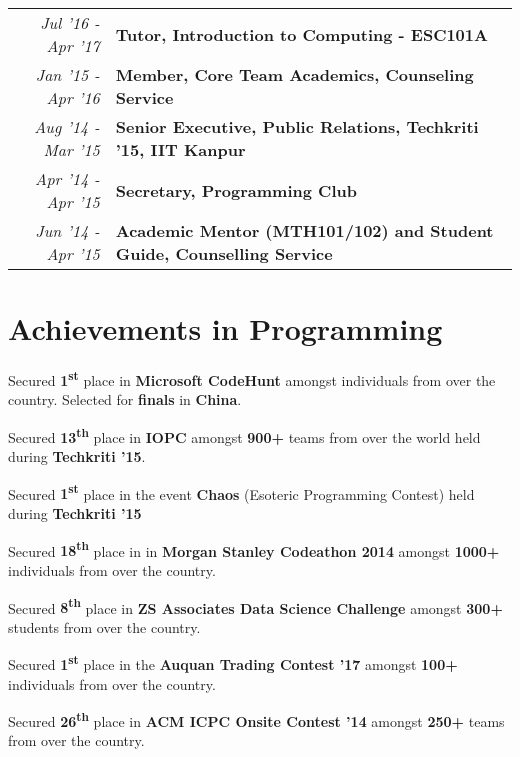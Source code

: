 \documentclass[a4paper]{norm-resume}
\begin{document}
\vspace{1mm} %
		
	\begin{tabular}{r|p{16cm}}	

	\null \hspace{10mm} \emph{Jul '16 - Apr '17} & \textbf{Tutor, Introduction to Computing - ESC101A}\\
	
	\emph{Jan '15 - Apr '16} & \textbf{Member, Core Team Academics, Counseling Service}\\

	\emph{Aug '14 - Mar '15} & \textbf{Senior Executive, Public Relations, Techkriti '15, IIT Kanpur}\\

	\emph{Apr '14 - Apr '15} & \textbf{Secretary, Programming Club}\\

	\emph{Jun '14 - Apr '15} & \textbf{Academic Mentor (MTH101/102) and Student Guide, Counselling Service}\\ 

	\end{tabular}


\vspace{1mm}	%



\section{Achievements in Programming \hrulefill}

\vspace{3mm} %

\begin{tightitemize}
	\item Secured \textbf{1\textsuperscript{st}} place in \textbf{Microsoft CodeHunt} amongst individuals from over the country. Selected for \textbf{finals} in \textbf{China}.
	\item Secured \textbf{13\textsuperscript{th}} place in \textbf{IOPC} amongst \textbf{900+} teams from over the world held during \textbf{Techkriti '15}.
	\item Secured \textbf{1\textsuperscript{st}} place in the event \textbf{Chaos} (Esoteric Programming Contest) held during \textbf{Techkriti '15}
	\item Secured \textbf{18\textsuperscript{th}} place in in \textbf{Morgan Stanley Codeathon 2014} amongst \textbf{1000+} individuals from over the country.
	\item Secured \textbf{8\textsuperscript{th}} place in \textbf{ZS Associates Data Science Challenge} amongst \textbf{300+} students from over the country.
	\item Secured \textbf{1\textsuperscript{st}} place in the \textbf{Auquan Trading Contest '17} amongst \textbf{100+} individuals from over the country.
	\item Secured \textbf{26\textsuperscript{th}} place in \textbf{ACM ICPC Onsite Contest '14} amongst \textbf{250+} teams from over the country.
\end{tightitemize}
\end{document}
